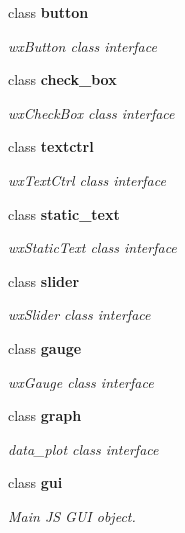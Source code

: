 \begin{DoxyCompactItemize}
class \textbf{ button}
\begin{DoxyCompactList}\small\item\em wx\+Button class interface \end{DoxyCompactList}\item 
class \textbf{ check\+\_\+box}
\begin{DoxyCompactList}\small\item\em wx\+Check\+Box class interface \end{DoxyCompactList}\item 
class \textbf{ textctrl}
\begin{DoxyCompactList}\small\item\em wx\+Text\+Ctrl class interface \end{DoxyCompactList}\item 
class \textbf{ static\+\_\+text}
\begin{DoxyCompactList}\small\item\em wx\+Static\+Text class interface \end{DoxyCompactList}\item 
class \textbf{ slider}
\begin{DoxyCompactList}\small\item\em wx\+Slider class interface \end{DoxyCompactList}\item 
class \textbf{ gauge}
\begin{DoxyCompactList}\small\item\em wx\+Gauge class interface \end{DoxyCompactList}\item 
class \textbf{ graph}
\begin{DoxyCompactList}\small\item\em data\+\_\+plot class interface \end{DoxyCompactList}\item 
class \textbf{ gui}
\begin{DoxyCompactList}\small\item\em Main JS G\+UI object. \end{DoxyCompactList}\end{DoxyCompactItemize}

